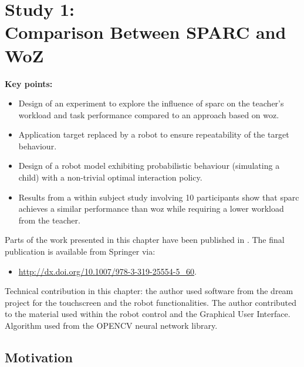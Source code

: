 \chapter[Study 1: Comparison Between SPARC and WoZ]{Study 1: \\ Comparison Between SPARC and WoZ}\label{chap:woz}
\glsresetall
\graphicspath{{images/woz/}}

\begin{framed}
	\textbf{Key points:}
	
	\begin{itemize}
		\item Design of an experiment to explore the influence of \acrshort{sparc} on the teacher's workload and task performance compared to an approach based on \acrshort{woz}.
		\item Application target replaced by a robot to ensure repeatability of the target behaviour.
		\item Design of a robot model exhibiting probabilistic behaviour (simulating a child) with a non-trivial optimal interaction policy.
		\item Results from a within subject study involving 10 participants show that \acrshort{sparc} achieves a similar performance than \acrshort{woz} while requiring a lower workload from the teacher.
	\end{itemize}
\end{framed}

Parts of the work presented in this chapter have been published in \cite{senft2015sparc}. The final publication is available from Springer via:
\begin{itemize}
	\item \url{http://dx.doi.org/10.1007/978-3-319-25554-5_60}.
\end{itemize} 

Technical contribution in this chapter: the author used software from the \acrshort{dream} project for the touchscreen and the robot functionalities. The author contributed to the material used within the robot control and the Graphical User Interface. Algorithm used from the OPENCV neural network library.

\newpage

\section{Motivation}

